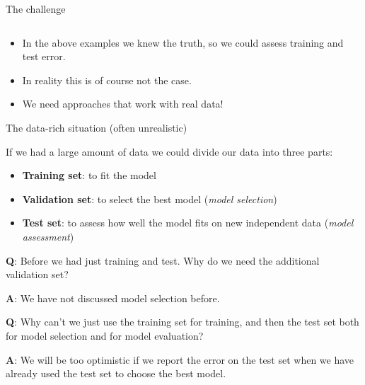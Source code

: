 \documentclass[10pt,ignorenonframetext,]{beamer}
\providecommand{\tightlist}{%
  \setlength{\itemsep}{0pt}\setlength{\parskip}{0pt}}
\begin{document}
\begin{frame}

\begin{block}{The challenge}

\(~\)

\begin{itemize}
\tightlist
\item
  In the above examples we knew the truth, so we could assess training
  and test error.
\end{itemize}

\vspace{2mm}

\begin{itemize}
\tightlist
\item
  In reality this is of course not the case.
\end{itemize}

\vspace{2mm}

\begin{itemize}
\tightlist
\item
  We need approaches that work with real data!
\end{itemize}

\end{block}

\end{frame}

\begin{frame}

\begin{block}{The data-rich situation (often unrealistic)}

\vspace{2mm}

If we had a large amount of data we could divide our data into three
parts:

\begin{itemize}
\tightlist
\item
  \textbf{Training set}: to fit the model
\item
  \textbf{Validation set}: to select the best model (\emph{model
  selection})
\item
  \textbf{Test set}: to assess how well the model fits on new
  independent data (\emph{model assessment})
\end{itemize}

\vspace{2mm}

\textbf{Q}: Before we had just training and test. Why do we need the
additional validation set?

\textbf{A}: We have not discussed model selection before.

\vspace{2mm}

\textbf{Q}: Why can't we just use the training set for training, and
then the test set both for model selection and for model evaluation?

\textbf{A}: We will be too optimistic if we report the error on the test
set when we have already used the test set to choose the best model.

\end{block}

\end{frame}
\end{document}
